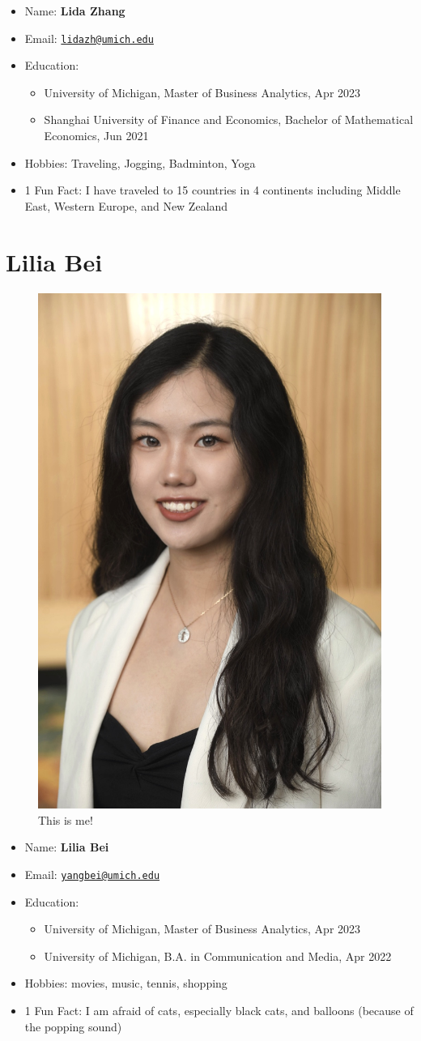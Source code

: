 \documentclass[
]{book}
\begin{document}
\begin{itemize}
\item
  Name: \textbf{Lida Zhang}
\item
  Email: \href{mailto:lidazh@umich.edu}{\nolinkurl{lidazh@umich.edu}}
\item
  Education:

  \begin{itemize}
  \item
    University of Michigan, Master of Business Analytics, Apr 2023
  \item
    Shanghai University of Finance and Economics, Bachelor of Mathematical Economics, Jun 2021
  \end{itemize}
\item
  Hobbies: Traveling, Jogging, Badminton, Yoga
\item
  1 Fun Fact: I have traveled to 15 countries in 4 continents including Middle East, Western Europe, and New Zealand
\end{itemize}

\hypertarget{lilia-bei}{%
\section{Lilia Bei}\label{lilia-bei}}

\begin{figure}
\includegraphics[width=0.2\linewidth,height=0.2\textheight]{lilia} \caption{This is me!}\label{fig:unnamed-chunk-4}
\end{figure}

\begin{itemize}
\item
  Name: \textbf{Lilia Bei}
\item
  Email: \href{mailto:yangbei@umich.edu}{\nolinkurl{yangbei@umich.edu}}
\item
  Education:

  \begin{itemize}
  \item
    University of Michigan, Master of Business Analytics, Apr 2023
  \item
    University of Michigan, B.A. in Communication and Media, Apr 2022
  \end{itemize}
\item
  Hobbies: movies, music, tennis, shopping
\item
  1 Fun Fact: I am afraid of cats, especially black cats, and balloons (because of the popping sound)
\end{itemize}
\end{document}
